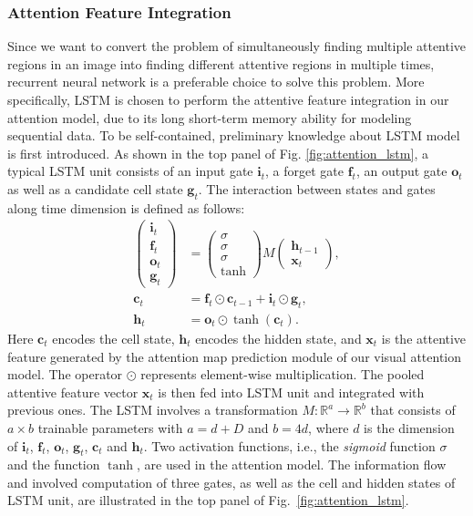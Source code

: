 \documentclass[journal]{IEEEtran}
\begin{document}
\subsubsection{Attention Feature Integration}
Since we want to convert the problem of simultaneously finding multiple attentive regions in an image into finding different attentive regions in multiple times, recurrent neural network is a preferable choice to solve this problem. More specifically, LSTM \cite{lstm} is chosen to perform the attentive feature integration in our attention model, due to its long short-term memory ability for modeling sequential data. To be self-contained, preliminary knowledge about LSTM model is first introduced. As shown in the top panel of Fig. \ref{fig:attention_lstm}, a typical LSTM unit consists of an input gate $\mathbf{i}_t$, a forget gate $\mathbf{f}_t$, an output gate $\mathbf{o}_t$ as well as a candidate cell state $\mathbf{g}_t$. The interaction between states and gates along time dimension is defined as follows:
\begin{align}
  \begin{pmatrix}
    \mathbf{i}_t\\ \mathbf{f}_t\\ \mathbf{o}_t\\ \mathbf{g}_t
  \end{pmatrix} &=
  \begin{pmatrix}
    \sigma \\ \sigma \\ \sigma \\ \text{tanh}
  \end{pmatrix}
  M
  \begin{pmatrix}
    \mathbf{h}_{t-1}\\ \mathbf{x}_t
  \end{pmatrix},\nonumber \\
  \mathbf{c}_t &= \mathbf{f}_t \odot \mathbf{c}_{t-1} + \mathbf{i}_t \odot \mathbf{g}_t,\\
  \mathbf{h}_t &= \mathbf{o}_t \odot \tanh\left(\mathbf{c}_t\right). \nonumber
\end{align}
Here $\mathbf{c}_t$ encodes the cell state, $\mathbf{h}_t$ encodes the hidden state, and $\mathbf{x}_t$ is the attentive feature generated by the attention map prediction module of our visual attention model.
The operator $ \odot $ represents element-wise multiplication. The pooled attentive feature vector $\mathbf{x}_t$  is then fed into LSTM unit and integrated with previous ones. The LSTM involves a transformation $M:\mathbb{R}^a \to \mathbb{R}^b$ that consists of $a\times b$ trainable parameters with $a=d+D$ and $b=4d$, where $d$ is the dimension of $\mathbf{i}_t$, $\mathbf{f}_t$, $\mathbf{o}_t$, $\mathbf{g}_t$, $\mathbf{c}_t$ and $\mathbf{h}_t$. Two activation functions, i.e., the \emph{sigmoid} function $\sigma$ and the function $\tanh$, are used in the attention model. The information flow and involved computation of three gates, as well as the cell and hidden states of LSTM unit, are illustrated in the top panel of Fig.~\ref{fig:attention_lstm}.
\end{document}
